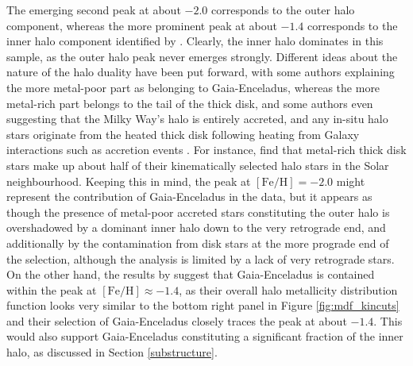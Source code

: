 \documentclass[a4paper,11pt]{article}
\begin{document}
The emerging second peak at about $-2.0$ corresponds to the outer halo component, whereas the more prominent peak at about $-1.4$ corresponds to the inner halo component identified by \citet{carollo07}. Clearly, the inner halo dominates in this sample, as the outer halo peak never emerges strongly. Different ideas about the nature of the halo duality have been put forward, with some authors explaining the more metal-poor part as belonging to Gaia-Enceladus, whereas the more metal-rich part belongs to the tail of the thick disk, and some authors even suggesting that the Milky Way’s halo is entirely accreted, and any in-situ halo stars originate from the heated thick disk following heating from Galaxy interactions such as accretion events \citep{helmi20}. For instance, \citet{dimatteo19} find that metal-rich thick disk stars make up about half of their kinematically selected halo stars in the Solar neighbourhood. Keeping this in mind, the peak at $\mathrm{[Fe/H]}=-2.0$ might represent the contribution of Gaia-Enceladus in the data, but it appears as though the presence of metal-poor accreted stars constituting the outer halo is overshadowed by a dominant inner halo down to the very retrograde end, and additionally by the contamination from disk stars at the more prograde end of the selection, although the analysis is limited by a lack of very retrograde stars. On the other hand, the results by \citet{ruizlara22} suggest that Gaia-Enceladus is contained within the peak at $\mathrm{[Fe/H]}\approx-1.4$, as their overall halo metallicity distribution function looks very similar to the bottom right panel in Figure \ref{fig:mdf_kincuts} and their selection of Gaia-Enceladus closely traces the peak at about $-1.4$. This would also support Gaia-Enceladus constituting a significant fraction of the inner halo, as discussed in Section \ref{substructure}.
%
\end{document}
